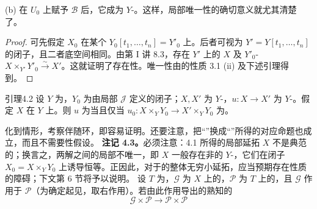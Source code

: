 (b) 在 $U_0$ 上赋予 $\mathcal B$ 后，它成为 $Y$-。这样，局部唯一性的确切意义就尤其清楚了。
\begin{proof}
可先假定 $X_0$ 在某个 $Y_0[t_1,\ldots,t_n]=Y'_0$ 上。后者可视为 $Y'=Y[t_1,\ldots,t_n]$ 的闭子，且二者底空间相同。由第 I 讲 8.3，存在 $Y'$ 上的 $X$ 及 $Y'_0$- $X\times_{Y'}Y'_0\xrightarrow{\sim}X'$。这就证明了存在性。唯一性由的性质 3.1 (ii) 及下述引理得到。
\end{proof}
\begin{SGAresult}{引理}{4.2}
设 $Y$ 为，$Y_0$ 为由局部 $\mathcal J$ 定义的闭子；$X,X'$ 为 $Y$-，$u:X\to X'$ 为 $Y$-。假定 $X$ 在 $Y$ 上。则 $u$ 为当且仅当 $u_0:X\times_Y Y_0\to X'\times_Y Y_0$ 为。
\end{SGAresult}
化到情形，考察伴随环，即容易证明。还要注意，把“”换成“”所得的对应命题也成立，而且不需要性假设。
\textbf{注记 4.3。}必须注意：4.1 所得的局部延拓 $X$ 不是典范的；换言之，两解之间的局部不唯一，即 $X$ 一般存在非的 $Y$-，它们在闭子 $X_0=X\times_Y Y_0$ 上诱导恒等。正因此，对于的整体无穷小延拓，应当预期存在性质的障碍；下文第 6 节将予以说明。
设 $T$ 为，$\mathcal G$ 为 $X$ 上的，$\mathcal P$ 为 $T$ 上的，且 $\mathcal G$ 作用于 $\mathcal P$（为确定起见，取右作用）。若由此作用导出的熟知的
\[\mathcal G\times\mathcal P\longrightarrow\mathcal P\times\mathcal P\]
